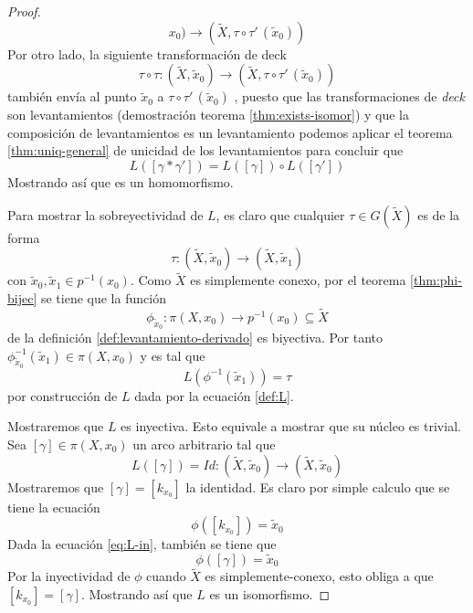 \begin{proof}
\[    x _0) \to (\tilde X , \tau \circ \tau' \, (\tilde x_0)) \]
  Por otro lado, la siguiente transformación de deck
  \[ \tau \circ \tau : (\tilde X, \tilde x _0) \to (\tilde X , \tau
    \circ \tau' \, (\tilde x_0))
  \]
  también envía al punto \(\tilde x_0\) a \(\tau \circ \tau' \, (\tilde
  x_0)\) , puesto que las transformaciones de \emph{deck} son
  levantamientos (demostración teorema \ref{thm:exists-isomor}) y que la
  composición de levantamientos es un levantamiento podemos aplicar el
  teorema \ref{thm:uniq-general} de unicidad de los levantamientos para
  concluir que
  \[ L \left( [\gamma * \gamma'] \right) = L \left( [\gamma] \right)
    \circ L \left( [\gamma'] \right)\]
  Mostrando así que es un homomorfismo.

  Para mostrar la sobreyectividad de \(L\), es claro que cualquier
  \(\tau \in G (\tilde X)\) es de la forma
  \[ \tau : (\tilde X, \tilde x_0) \to (\tilde X, \tilde x_1) \]
  con \(\tilde x_0, \tilde x_1 \in p^{-1} (x_0)\). Como \(\tilde X\) es
  simplemente conexo, por el teorema \ref{thm:phi-bijec} se tiene que la
  función
  \[\phi_{\tilde x_0} : \pi (X, x_0) \to p^{-1} (x_0) \subseteq \tilde
    X \]
  de la definición \ref{def:levantamiento-derivado} es
  biyectiva. Por tanto \(\phi_{\tilde x_0}^{-1} (\tilde x_1) \in \pi (X,
  x_0)\) y es tal que
  \[ L \left( \phi^{-1} (\tilde x_1) \right) = \tau \]
  por construcción de \(L\) dada por la ecuación \eqref{def:L}.

  Mostraremos que \(L\) es inyectiva. Esto equivale a mostrar que su
  núcleo es trivial. Sea \([\gamma] \in \pi (X , x_0)\) un arco
  arbitrario tal que
  \begin{equation} \label{eq:L-in}
    L \left( [\gamma] \right) = Id : (\tilde X , \tilde x_0) \to
      (\tilde X, \tilde x_0)
  \end{equation}
  Mostraremos que \([\gamma] = [k_{x_0}]\) la identidad. Es claro por
  simple calculo que se tiene la ecuación
  \[ \phi \left( [k_{x_0}] \right) = \tilde x _0 \]
  Dada la ecuación \eqref{eq:L-in}, también se tiene que
  \[ \phi \left( [\gamma] \right) = \tilde x_0 \]
  Por la inyectividad de \(\phi\) cuando \(\tilde X\) es
  simplemente-conexo, esto obliga a que \([k_{x_0}] = [\gamma]\).
  Mostrando así que \(L\) es un isomorfismo.
\end{proof}

